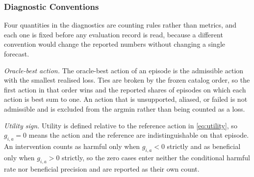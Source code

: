 \documentclass{article}
\begin{document}
\begin{table}[h]
  \caption{Per-source seasonal periods and context conventions used by the metric
  denominators. Context length is $L = 512$ for every source. The seasonal period is the
  sampling-frequency period registered before any run, not a tuned quantity.}
  \label{tab:app-seasonality}
  \centering
  \small
  \setlength{\tabcolsep}{4pt}
\end{table}

\subsubsection{Diagnostic Conventions}
\label{app:diagnostic-conventions}
Four quantities in the diagnostics are counting rules rather than metrics, and each one is
fixed before any evaluation record is read, because a different convention would change the
reported numbers without changing a single forecast.

\emph{Oracle-best action.} The oracle-best action of an episode is the admissible action with
the smallest realised loss. Ties are broken by the frozen catalog order, so the first action in
that order wins and the reported shares of episodes on which each action is best sum to one. An
action that is unsupported, aliased, or failed is not admissible and is excluded from the
argmin rather than being counted as a loss.

\emph{Utility sign.} Utility is defined relative to the reference action in
\eqref{eq:utility}, so $g_{i,a} = 0$ means the action and the reference are indistinguishable on
that episode. An intervention counts as harmful only when $g_{i,a} < 0$ strictly and as
beneficial only when $g_{i,a} > 0$ strictly, so the zero cases enter neither the conditional
harmful rate nor beneficial precision and are reported as their own count.
\end{document}
